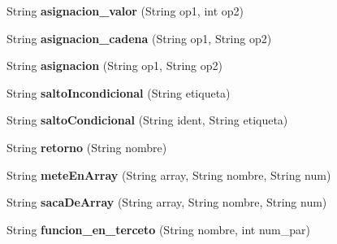 \begin{DoxyCompactItemize}
\item 
\hypertarget{classcompilationunit_1_1_tercetos_a24f6308b16a99f4066995d74143e3e59}{
String {\bfseries asignacion\_\-valor} (String op1, int op2)}
\label{classcompilationunit_1_1_tercetos_a24f6308b16a99f4066995d74143e3e59}

\item 
\hypertarget{classcompilationunit_1_1_tercetos_ad1711317bac0cecaf116f3c60d8615ee}{
String {\bfseries asignacion\_\-cadena} (String op1, String op2)}
\label{classcompilationunit_1_1_tercetos_ad1711317bac0cecaf116f3c60d8615ee}

\item 
\hypertarget{classcompilationunit_1_1_tercetos_a123bc25fd5c42d32ba2997a4a0413226}{
String {\bfseries asignacion} (String op1, String op2)}
\label{classcompilationunit_1_1_tercetos_a123bc25fd5c42d32ba2997a4a0413226}

\item 
\hypertarget{classcompilationunit_1_1_tercetos_ae218b9b85f0bd33c78e838fb7050b5d0}{
String {\bfseries saltoIncondicional} (String etiqueta)}
\label{classcompilationunit_1_1_tercetos_ae218b9b85f0bd33c78e838fb7050b5d0}

\item 
\hypertarget{classcompilationunit_1_1_tercetos_a9562cbe1811db849e7b0541d76457e73}{
String {\bfseries saltoCondicional} (String ident, String etiqueta)}
\label{classcompilationunit_1_1_tercetos_a9562cbe1811db849e7b0541d76457e73}

\item 
\hypertarget{classcompilationunit_1_1_tercetos_ab7ec91ed4806f0cb841d193e6767aa10}{
String {\bfseries retorno} (String nombre)}
\label{classcompilationunit_1_1_tercetos_ab7ec91ed4806f0cb841d193e6767aa10}

\item 
\hypertarget{classcompilationunit_1_1_tercetos_a4060ef6a5f9dbd6c7f8a95de1ced5f38}{
String {\bfseries meteEnArray} (String array, String nombre, String num)}
\label{classcompilationunit_1_1_tercetos_a4060ef6a5f9dbd6c7f8a95de1ced5f38}

\item 
\hypertarget{classcompilationunit_1_1_tercetos_aabe96c01aa1c03ccaa6551718d8db9cc}{
String {\bfseries sacaDeArray} (String array, String nombre, String num)}
\label{classcompilationunit_1_1_tercetos_aabe96c01aa1c03ccaa6551718d8db9cc}

\item 
\hypertarget{classcompilationunit_1_1_tercetos_a7b7692a07ae2e8376057f8622fc8f46b}{
String {\bfseries funcion\_\-en\_\-terceto} (String nombre, int num\_\-par)}
\label{classcompilationunit_1_1_tercetos_a7b7692a07ae2e8376057f8622fc8f46b}


\end{DoxyCompactItemize}
